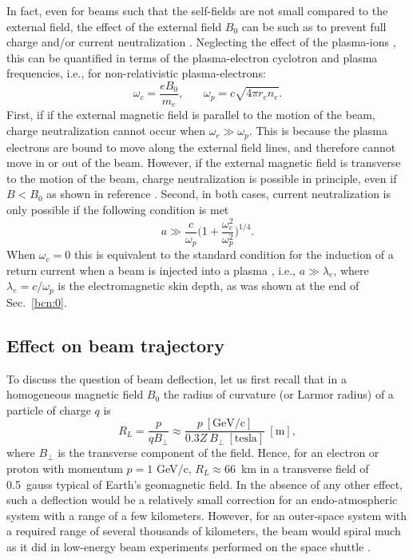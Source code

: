 \documentclass [12pt,a4paper,     ]{report} %
\begin{document}
   In fact, even for beams such that the self-fields are not small compared to the external field, the effect of the external field $B_0$ can be such as to prevent full charge and/or current neutralization \cite{LEE--1971-, ROSIN1973-, CHU--1973-}.  Neglecting the effect of the plasma-ions \cite{ROSIN1973-, CHU--1973-}, this can be quantified in terms of the plasma-electron cyclotron and plasma frequencies, i.e., for non-relativistic plasma-electrons:
%
\begin{equation}\label{mag:2} 
         \omega_c = \frac{e B_0}{m_e}, ~~ ~~ ~~ ~~ 
          \omega_p = c \sqrt{4\pi r_e n_e}.
\end{equation}
%
First, if if the external magnetic field is parallel to the motion of the beam, charge neutralization cannot occur when $\omega_c \gg \omega_p$. This is because the plasma electrons are bound to move along the external field lines, and therefore cannot move in or out of the beam.  However, if the external magnetic field is transverse to the motion of the beam, charge neutralization is possible in principle, even if  $B < B_0$ as shown in reference \cite{CHRIE1986-}.  Second, in both cases, current neutralization is only possible if the following condition is met \cite{ROSIN1973-} 
%
\begin{equation}\label{mag:3} 
    a \gg \frac{c}{\omega_p}\Big(1 + \frac{\omega_c^2}{\omega_p^2} \Big)^{1/4}.
\end{equation}
%
When $\omega_c=0$ this is equivalent to the standard condition for the induction of a return current when a beam is injected into a plasma \cite{HAMME1970-}, i.e., $a \gg \lambda_e$, where $\lambda_e = c/\omega_p$ is the electromagnetic skin depth, as was shown at the end of Sec.~\ref{bcn:0}.


\subsection{Effect on beam trajectory}

     To discuss the question of beam deflection, let us first recall that in a homogeneous magnetic field $B_0$ the radius of curvature (or Larmor radius) of a particle of charge $q$ is
%
\begin{equation}\label{mag:4} %
	       R_L = \frac{p}{q B_{\perp}}
                   \approx \frac{p~[\text{GeV/c}]}
                          {0.3Z~B_{\perp}~[\text{tesla}]}~[\text{m}],
\end{equation}
%
where $B_{\perp}$ is the transverse component of the field.  Hence, for an electron or proton with momentum $p=1$ GeV/c,  $R_L \approx 66$~km in a transverse field of 0.5~gauss typical of Earth's geomagnetic field.  In the absence of any other effect, such a deflection would be a relatively small correction for an endo-atmospheric system with a range of a few kilometers.  However, for an outer-space system with a required range of several thousands of kilometers, the beam would spiral much as it did in low-energy beam experiments performed on the space shuttle \cite{KIWAM1977-}.
\end{document}

